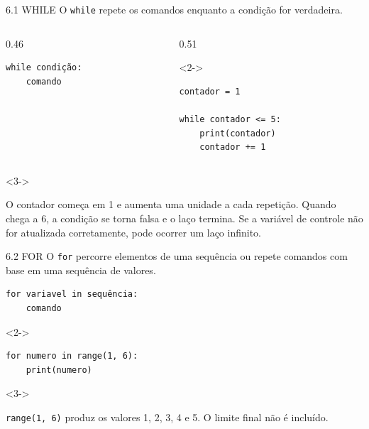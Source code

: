 \begin{frame}[fragile,t]{6.1 WHILE}
O \texttt{while} repete os comandos enquanto a condição for verdadeira.\par
\begin{columns}[T,onlytextwidth]
\begin{column}{0.46\textwidth}
\begin{lstlisting}
while condição:
    comando
\end{lstlisting}
\end{column}
\begin{column}{0.51\textwidth}
\begin{visibleenv}<2->
\begin{lstlisting}
contador = 1

while contador <= 5:
    print(contador)
    contador += 1
\end{lstlisting}
\end{visibleenv}
\end{column}
\end{columns}
\begin{visibleenv}<3->
\begin{EMASCnote}
O contador começa em 1 e aumenta uma unidade a cada repetição. Quando chega a 6, a condição se torna falsa e o laço termina. Se a variável de controle não for atualizada corretamente, pode ocorrer um laço infinito.
\end{EMASCnote}
\end{visibleenv}
\end{frame}

\begin{frame}[fragile,t]{6.2 FOR}
O \texttt{for} percorre elementos de uma sequência ou repete comandos com base em uma sequência de valores.\par
{}
\begin{lstlisting}
for variavel in sequência:
    comando
\end{lstlisting}
\begin{visibleenv}<2->
\begin{lstlisting}
for numero in range(1, 6):
    print(numero)
\end{lstlisting}
\end{visibleenv}
\begin{visibleenv}<3->
\begin{EMASCnote}
\texttt{range(1, 6)} produz os valores 1, 2, 3, 4 e 5. O limite final não é incluído.
\end{EMASCnote}
\end{visibleenv}
\end{frame}

